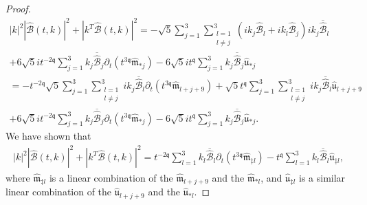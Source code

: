 \documentclass[reqno]{amsart}
\newcommand{\qq}{\mathfrak{q}}
\newcommand{\tq}{t^{\qq}}
\newcommand{\tTq}{t^{3\qq}}
\theoremstyle{definition}
\numberwithin{equation}{section}
\numberwithin{theorem}{section}
\begin{document}
\begin{proof}
\begin{multline*}
    |k|^2 |\widehat{\mathcal{B}}(t,k)|^2 + |k^T\widehat{\mathcal{B}}(t,k)|^2
    =
    -\sqrt{5}\sum_{j=1}^3\sum_{\substack{l=1 \\ l\neq j}}^3 \left(ik_j \widehat{\mathcal{B}}_l+ik_l \widehat{\mathcal{B}}_j \right)ik_j \overline{\widehat{\mathcal{B}}}_l
    \\
    +
6\sqrt{5}it^{-2\qq} 
\sum_{j=1}^3 
k_j\overline{\widehat{\mathcal{B}}}_j\partial_t\left( \tTq \widehat{\mathfrak{m}}_{*j} \right)
-
6\sqrt{5}i\tq
\sum_{j=1}^3
k_j \overline{\widehat{\mathcal{B}}}_j\widehat{\mathfrak{u}}_{*j}
\\
=
- t^{-2\qq}  \sqrt{5} \sum_{j=1}^3\sum_{\substack{l=1 \\ l\neq j}}^3 ik_j \overline{\widehat{\mathcal{B}}}_l\partial_t\left( \tTq \widehat{\mathfrak{m}}_{l+j+9} \right)
+
\sqrt{5}\tq\sum_{j=1}^3\sum_{\substack{l=1 \\ l\neq j}}^3 ik_j \overline{\widehat{\mathcal{B}}}_l \hat{\mathfrak{u}}_{l+j+9}
    \\
    +
6\sqrt{5}it^{-2\qq} 
\sum_{j=1}^3 
k_j\overline{\widehat{\mathcal{B}}}_j\partial_t\left( \tTq \widehat{\mathfrak{m}}_{*j} \right)
-
6\sqrt{5}i\tq
\sum_{j=1}^3
k_j \overline{\widehat{\mathcal{B}}}_j\widehat{\mathfrak{u}}_{*j}.
\end{multline*}
We have shown that 
\begin{align*}
    |k|^2 |\widehat{\mathcal{B}}(t,k)|^2 + |k^T\widehat{\mathcal{B}}(t,k)|^2
    =
t^{-2\qq} 
\sum_{l=1}^3 
k_l\overline{\widehat{\mathcal{B}}}_l\partial_t\left( \tTq \widehat{\mathfrak{m}}_{\ddagger l} \right)
-
\tq
\sum_{l=1}^3
k_l \overline{\widehat{\mathcal{B}}}_l \widehat{\mathfrak{u}}_{\ddagger l},
\end{align*}
where $\widehat{\mathfrak{m}}_{\ddagger l}$ is a linear combination of the $\widehat{\mathfrak{m}}_{l+j+9}$ and the $\widehat{\mathfrak{m}}_{*l}$, 
and $\widehat{\mathfrak{u}}_{\ddagger l}$ is a similar linear combination of the $\widehat{\mathfrak{u}}_{l+j+9}$ and the $\widehat{\mathfrak{u}}_{*l}$. 




\end{proof}
\end{document}
